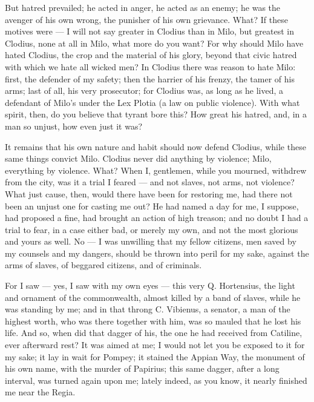  But hatred prevailed; he acted in anger, he acted as an enemy; he was the avenger of his own wrong, the punisher of his own grievance. What? If these motives were --- I will not say greater in Clodius than in Milo, but greatest in Clodius, none at all in Milo, what more do you want? For why should Milo have hated Clodius, the crop and the material of his glory, beyond that civic hatred with which we hate all wicked men? In Clodius there was reason to hate Milo: first, the defender of my safety; then the harrier of his frenzy, the tamer of his arms; last of all, his very prosecutor; for Clodius was, as long as he lived, a defendant of Milo's under the Lex Plotia (a law on public violence). With what spirit, then, do you believe that tyrant bore this? How great his hatred, and, in a man so unjust, how even just it was?

 It remains that his own nature and habit should now defend Clodius, while these same things convict Milo. Clodius never did anything by violence; Milo, everything by violence. What? When I, gentlemen, while you mourned, withdrew from the city, was it a trial I feared --- and not slaves, not arms, not violence? What just cause, then, would there have been for restoring me, had there not been an unjust one for casting me out? He had named a day for me, I suppose, had proposed a fine, had brought an action of high treason; and no doubt I had a trial to fear, in a case either bad, or merely my own, and not the most glorious and yours as well. No --- I was unwilling that my fellow citizens, men saved by my counsels and my dangers, should be thrown into peril for my sake, against the arms of slaves, of beggared citizens, and of criminals.

 For I saw --- yes, I saw with my own eyes --- this very Q. Hortensius, the light and ornament of the commonwealth, almost killed by a band of slaves, while he was standing by me; and in that throng C. Vibienus, a senator, a man of the highest worth, who was there together with him, was so mauled that he lost his life. And so, when did that dagger of his, the one he had received from Catiline, ever afterward rest? It was aimed at me; I would not let you be exposed to it for my sake; it lay in wait for Pompey; it stained the Appian Way, the monument of his own name, with the murder of Papirius; this same dagger, after a long interval, was turned again upon me; lately indeed, as you know, it nearly finished me near the Regia.

